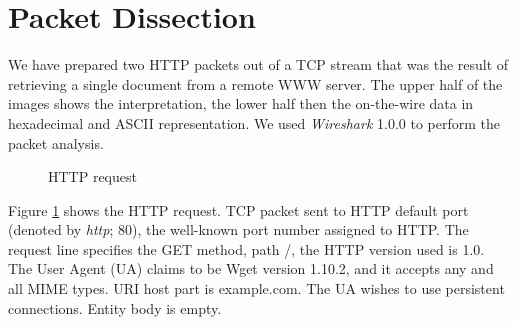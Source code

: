 \documentclass[10pt]{report}
\begin{document}
\section{Packet Dissection}

We have prepared two HTTP packets out of a TCP stream that was the
result of retrieving a single document from a remote WWW server.  The
upper half of the images shows the interpretation, the lower half then
the on-the-wire data in hexadecimal and ASCII representation.  We used
{\em Wireshark} 1.0.0 to perform the packet analysis.

\begin{figure}[p]
    \centering
    \setlength\fboxsep{0pt}
    \setlength\fboxrule{0.5pt}
    \caption{HTTP request}
    \label{httprequest}
\end{figure}

Figure \ref{httprequest} shows the HTTP request. 
TCP packet sent to HTTP default port (denoted by {\em http}; 80), the well-known port number assigned to HTTP.
The request line specifies the GET method, path /, the HTTP version used is 1.0.
The User Agent (UA) claims to be Wget version 1.10.2, and it accepts any and all MIME types.
URI host part is example.com.  The UA wishes to use persistent connections.
Entity body is empty.
\end{document}
